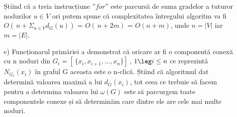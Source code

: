 \documentclass[12pt]{article}
\begin{document}
\begin{itemize}
    Știind că a treia instrucțiune $”for”$ este parcursă de suma gradelor a tuturor nodurilor $u \in V$ ori putem spune că complexitatea întregului algoritm va fi $O ( \, n + \Sigma_{u \in V}d_G(u))$ = $O ( \, n + 2m) $ = $O(n+m)$, unde $n=|V|$ iar $m=|E|$.
    
    
    
    \item[e)]
    Funcționarul primăriei a demonstrat că oricare ar fi o componentă conexă cu n noduri din $G_i = [ \, \{ x_i, x_{i+1}, ..., x_n 	\} ] \,$, $ 1 \leg i \leq n$ ce reprezintă $N_G_i(x_i)$ în graful G aceasta este o n-clică. Știind că algoritmul dat determină valoarea maximă a lui $d_G(x_i)$, tot ceea ce trebuie să facem pentru a determina valoarea lui $ \omega (G)$ este să parcurgem toate componentele conexe și să determinăm care dintre ele are cele mai multe noduri.  

    \end{itemize}
\end{document}
